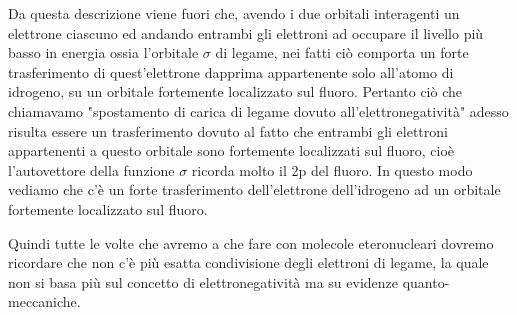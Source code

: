 Da questa descrizione viene fuori che, avendo i due orbitali interagenti un elettrone ciascuno ed andando entrambi gli elettroni ad occupare il livello più basso in energia ossia l'orbitale $\sigma$ di legame, nei fatti ciò comporta un forte trasferimento di quest'elettrone dapprima appartenente solo all'atomo di idrogeno, su un orbitale fortemente localizzato sul fluoro. Pertanto ciò che chiamavamo "spostamento di carica di legame dovuto all'elettronegatività" adesso risulta essere un trasferimento dovuto al fatto che entrambi gli elettroni appartenenti a questo orbitale sono fortemente localizzati sul fluoro, cioè l'autovettore della funzione $\sigma$ ricorda molto il 2p del fluoro. In questo modo vediamo che c'è un forte trasferimento dell'elettrone dell'idrogeno ad un orbitale fortemente localizzato sul fluoro.

Quindi tutte le volte che avremo a che fare con molecole eteronucleari dovremo ricordare che non c'è più esatta condivisione degli elettroni di legame, la quale non si basa più sul concetto di elettronegatività ma su evidenze quanto-meccaniche.

